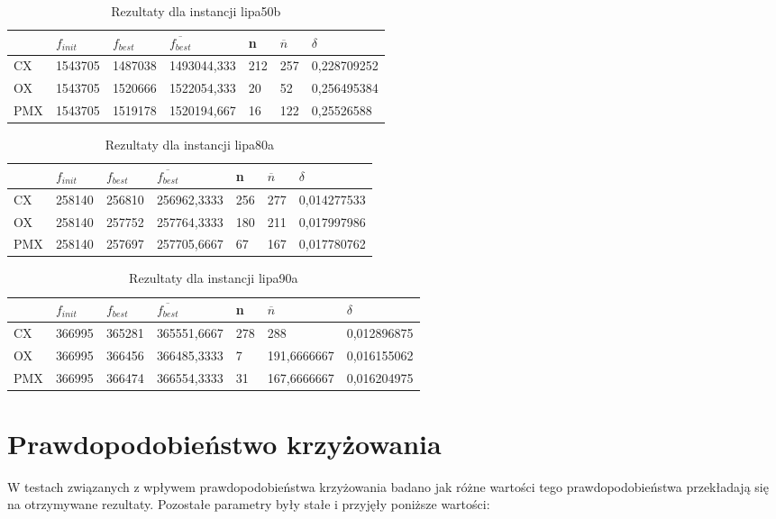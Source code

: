 \begin{table}[H]
\label{T2_lipa50b}
\begin{tabular}{l l l l l l l}
\hline
 & $f_{init}$ & $f_{best}$ & $\overline{f_{best}}$ & n & $\overline{n}$ & $\delta$ \\
\hline
CX & 1543705 & 1487038 & 1493044,333 & 212 & 257 & 0,228709252\\
OX & 1543705 & 1520666 & 1522054,333 & 20 & 52 & 0,256495384\\
PMX & 1543705 & 1519178 & 1520194,667 & 16 & 122 & 0,25526588\\
\hline
\end{tabular}
\caption{Rezultaty dla instancji lipa50b}
\end{table}

\begin{table}[H]
\label{T2_lipa80a}
\begin{tabular}{l l l l l l l}
\hline
 & $f_{init}$ & $f_{best}$ & $\overline{f_{best}}$ & n & $\overline{n}$ & $\delta$ \\
\hline
CX & 258140 & 256810 & 256962,3333 & 256 & 277 & 0,014277533\\
OX & 258140 & 257752 & 257764,3333 & 180 & 211 & 0,017997986\\
PMX & 258140 & 257697 & 257705,6667 & 67 & 167 & 0,017780762\\
\hline
\end{tabular}
\caption{Rezultaty dla instancji lipa80a}
\end{table}

\begin{table}[H]
\label{T2_lipa90a}
\begin{tabular}{l l l l l l l}
\hline
 & $f_{init}$ & $f_{best}$ & $\overline{f_{best}}$ & n & $\overline{n}$ & $\delta$ \\
\hline
CX & 366995 & 365281 & 365551,6667 & 278 & 288 & 0,012896875\\
OX & 366995 & 366456 & 366485,3333 & 7 & 191,6666667 & 0,016155062\\
PMX	& 366995 & 366474 & 366554,3333 & 31 & 167,6666667 & 0,016204975\\
\hline
\end{tabular}
\caption{Rezultaty dla instancji lipa90a}
\end{table}

\section{Prawdopodobieństwo krzyżowania}
W testach związanych z wpływem prawdopodobieństwa krzyżowania badano jak różne wartości tego prawdopodobieństwa przekładają się na otrzymywane rezultaty. Pozostałe parametry były stałe i przyjęły poniższe wartości:

